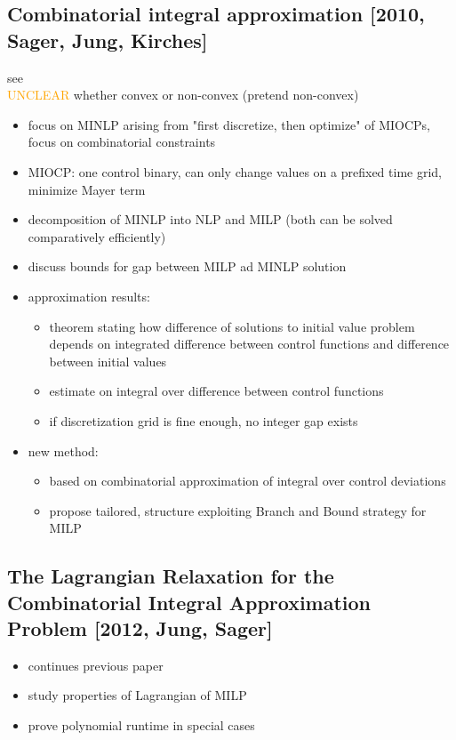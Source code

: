 \documentclass{article}
\begin{document}
\subsection{Combinatorial integral approximation [2010, Sager, Jung, Kirches]}
see \cite{sager2011combinatorial}\\
\textcolor{orange}{UNCLEAR} whether convex or non-convex (pretend non-convex)
\begin{itemize}
\item focus on MINLP arising from "first discretize, then optimize" of MIOCPs, focus on combinatorial constraints
\item MIOCP: one control binary, can only change values on a prefixed time grid, minimize Mayer term
\item decomposition of MINLP into NLP and MILP (both can be solved comparatively efficiently)
\item discuss bounds for gap between MILP ad MINLP solution
\item approximation results:
	\begin{itemize}
	\item theorem stating how difference of solutions to initial value problem depends on integrated difference between control functions and difference between initial values
	\item estimate on integral over difference between control functions
	\item if discretization grid is fine enough, no integer gap exists
	\end{itemize}
\item new method:
	\begin{itemize}
	\item based on combinatorial approximation of integral over control deviations
	\item propose tailored, structure exploiting Branch and Bound strategy for MILP
	\end{itemize}	 
\end{itemize}
\subsection{The Lagrangian Relaxation for the Combinatorial Integral Approximation Problem [2012, Jung, Sager]}
\begin{itemize}
\item continues previous paper
\item study properties of Lagrangian of MILP
\item prove polynomial runtime in special cases
\end{itemize}
\end{document}
